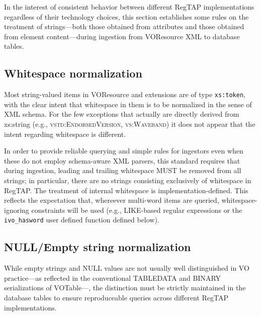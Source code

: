 \documentclass[11pt,a4paper]{ivoa}
\newcommand{\rtent}[1]{\texttt{\color{rtcolor} #1}}
\newcommand{\vorent}[1]{\textsc{#1}}
\begin{document}
\label{stringnorm}

In the interest of consistent behavior between different RegTAP
implementations regardless of their technology choices, this section
establishes some rules on the treatment of strings—both those
obtained from attributes and those obtained from element
content—during ingestion from VOResource XML to database
tables.



\subsection{Whitespace normalization}

\label{whitenorm}

Most string-valued items in VOResource and extensions are of type
\texttt{xs:token}, with the clear intent that whitespace in them is
to be normalized in the sense of XML schema.  For the few exceptions
that actually are directly derived from xs:string (e.g.,
\vorent{vstd:EndorsedVersion}, \vorent{vs:Waveband}) it does not
appear that the intent regarding whitespace is different.

In order to provide reliable querying and simple rules for ingestors
even when these do not employ schema-aware XML parsers, this standard
requires that during ingestion, leading and trailing whitespace MUST be
removed from all strings; in particular, there are no strings consisting
exclusively of whitespace in RegTAP.  The treatment of internal
whitespace is implementation-defined. This reflects the expectation
that, whereever multi-word items are queried, whitespace-ignoring
constraints will be used (e.g., LIKE-based regular expressions or the
\rtent{ivo\_hasword} user defined function defined below).




\subsection{NULL/Empty string normalization}

\label{nullnorm}

While empty strings and NULL values are not usually well
distinguished in VO practice—as reflected in the conventional
TABLEDATA and BINARY serializations of VOTable—, the distinction
must be strictly maintained in the database tables to ensure
reproduceable queries across different RegTAP implementations.
\end{document}
